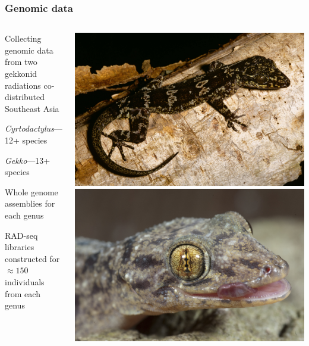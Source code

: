 
\begin{frame}
    \frametitle{Genomic data}
    \begin{columns}[c]
        \begin{myitemize}
            \item Collecting genomic data from two gekkonid radiations
                co-distributed Southeast Asia
            \begin{myitemize}
                \item \emph{Cyrtodactylus}---12+ species
                \item \emph{Gekko}---13+ species
            \end{myitemize}
            \item Whole genome assemblies for each genus
            \item RAD-seq libraries constructed for $\approx150$ individuals
                from each genus
        \end{myitemize}
        \includegraphics[width=\textwidth]{../images/photos/cyrt-agusanensis.jpg} \quad
        \includegraphics[width=\textwidth]{../images/photos/gekko-mindorensis.jpg}
    \end{columns}
\end{frame}

